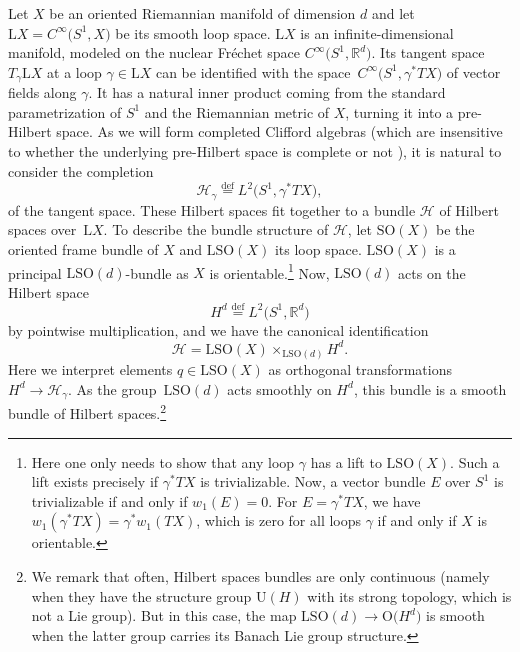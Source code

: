\documentclass[pdftex]{sigma}
\numberwithin{equation}{section}
\newcommand{\R}{\mathbb{R}}
\newcommand{\Cl}{\mathrm{Cl}}
\newcommand{\SO}{\mathrm{SO}}
\newcommand{\U}{\mathrm{U}}
\renewcommand{\O}{\mathrm{O}}
\renewcommand{\L}{\mathrm{L}}
\newcommand{\defeq}{\stackrel{\mathrm{def}}{=}}
\begin{document}
Let $X$ be an oriented Riemannian manifold of dimension $d$ and let $\L X = C^\infty\big(S^1, X\big)$ be its smooth loop space.
$\L X$ is an infinite-dimensional manifold, modeled on the nuclear Fr\'echet space $C^\infty\big(S^1, \R^d\big)$.
Its tangent space $T_\gamma \L X$ at a loop $\gamma \in \L X$ can be identified with the space~$C^\infty\big(S^1, \gamma^*TX\big)$ of vector fields along $\gamma$.
It has a natural inner product coming from the standard parametrization of $S^1$ and the Riemannian metric of $X$, turning it into a pre-Hilbert space.
As we will form completed Clifford algebras (which are insensitive to whether the underlying pre-Hilbert space is complete or not \cite{PlymenRobinson}), it is natural to consider the completion
\begin{equation*}%
 \mathcal{H}_\gamma \defeq L^2\big(S^1, \gamma^* TX\big),
\end{equation*}
of the tangent space.
These Hilbert spaces fit together to a bundle $\mathcal{H}$ of Hilbert spaces over~$\L X$.
To describe the bundle structure of $\mathcal{H}$, let $\SO(X)$ be the oriented frame bundle of $X$ and $\L \SO(X)$ its loop space.
$\L \SO(X)$ is a principal $\L \SO(d)$-bundle as $X$ is orientable.\footnote{Here one only needs to show that any loop $\gamma$ has a lift to $\L\SO(X)$. Such a lift exists precisely if $\gamma^*TX$ is trivializable.
Now, a vector bundle $E$ over $S^1$ is trivializable if and only if $w_1(E) = 0$. For $E = \gamma^*TX$, we have $w_1(\gamma^*TX) = \gamma^*w_1(TX)$, which is zero for all loops $\gamma$ if and only if $X$ is orientable.}
Now, $\L \SO(d)$ acts on the Hilbert space
\begin{equation}
\label{DefinitionHd}
 H^d \defeq L^2\big(S^1, \R^d\big)
\end{equation}
by pointwise multiplication, and we have the canonical identification
\begin{equation*}
 \mathcal{H} = \L\SO(X) \times_{\L\SO(d)} H^d.
\end{equation*}
Here we interpret elements $q \in \L \SO(X)$ as orthogonal transformations $H^d \to \mathcal{H}_\gamma$.
As the group~$\L\SO(d)$ acts smoothly on $H^d$, this bundle is a smooth bundle of Hilbert spaces.\footnote{We remark that often, Hilbert spaces bundles are only continuous (namely when they have the structure group $\U(H)$ with its strong topology, which is not a Lie group).
But in this case, the map $\L\SO(d) \to \O\big(H^d\big)$ is smooth when the latter group carries its Banach Lie group structure.}
\end{document}
